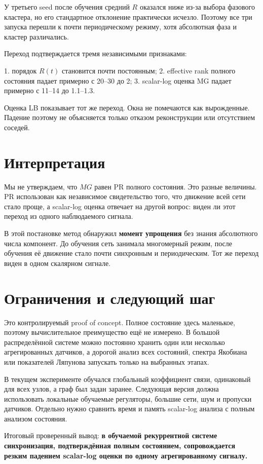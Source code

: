 \documentclass[10pt,a4paper]{article}
\begin{document}
У третьего seed после обучения средний $R$ оказался ниже из-за выбора фазового кластера, но его стандартное отклонение практически исчезло. Поэтому все три запуска перешли к почти периодическому режиму, хотя абсолютная фаза и кластер различались.

Переход подтверждается тремя независимыми признаками:

1. порядок $R(t)$ становится почти постоянным;
2. effective rank полного состояния падает примерно с 20--30 до 2;
3. scalar-log оценка MG падает примерно с 11--14 до 1.1--1.3.

Оценка LB показывает тот же переход. Окна не помечаются как вырожденные. Падение поэтому не объясняется только отказом реконструкции или отсутствием соседей.

\section*{Интерпретация}

Мы не утверждаем, что $MG$ равен PR полного состояния. Это разные величины. PR использован как независимое свидетельство того, что движение всей сети стало проще, а scalar-log оценка отвечает на другой вопрос: виден ли этот переход из одного наблюдаемого сигнала.

В этой постановке метод обнаружил \textbf{момент упрощения} без знания абсолютного числа компонент. До обучения сеть занимала многомерный режим, после обучения её движение стало почти синхронным и периодическим. Тот же переход виден в одном скалярном сигнале.

\section*{Ограничения и следующий шаг}

Это контролируемый proof of concept. Полное состояние здесь маленькое, поэтому вычислительное преимущество ещё не измерено. В большой распределённой системе можно постоянно хранить один или несколько агрегированных датчиков, а дорогой анализ всех состояний, спектра Якобиана или показателей Ляпунова запускать только на выбранных этапах.

В текущем эксперименте обучался глобальный коэффициент связи, одинаковый для всех узлов, а граф был задан заранее. Следующая версия должна использовать локальные обучаемые регуляторы, большие сети, шум и пропуски датчиков. Отдельно нужно сравнить время и память scalar-log анализа с полным анализом состояния.

Итоговый проверенный вывод: \textbf{в обучаемой рекуррентной системе синхронизация, подтверждённая полным состоянием, сопровождается резким падением scalar-log оценки по одному агрегированному сигналу.}
\end{document}
